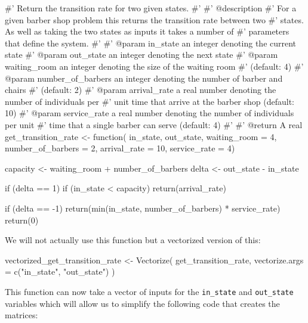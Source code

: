 \begin{Rin}
#' Return the transition rate for two given states.
#'
#' @description
#' For a given barber shop problem this returns the transition rate between two
#' states. As well as taking the two states as inputs it takes a number of
#' parameters that define the system.
#'
#' @param in_state an integer denoting the current state
#' @param out_state an integer denoting the next state
#' @param waiting_room an integer denoting the size of the waiting room
#' (default: 4)
#' @param number_of_barbers an integer denoting the number of barber and chairs
#' (default: 2)
#' @param arrival_rate a real number denoting the number of individuals per
#' unit time that arrive at the barber shop (default: 10)
#' @param service_rate a real number denoting the number of individuals per unit
#' time that a single barber can serve (default: 4)
#'
#' @return A real
get_transition_rate <- function(
                                in_state,
                                out_state,
                                waiting_room = 4,
                                number_of_barbers = 2,
                                arrival_rate = 10,
                                service_rate = 4) {
  capacity <- waiting_room + number_of_barbers
  delta <- out_state - in_state

  if (delta == 1) {
    if (in_state < capacity) {
      return(arrival_rate)
    }
  }

  if (delta == -1) {
    return(min(in_state, number_of_barbers) * service_rate)
  }
  return(0)
}
\end{Rin}

We will not actually use this function but a vectorized version of this:

\begin{Rin}
vectorized_get_transition_rate <- Vectorize(
  get_transition_rate,
  vectorize.args = c("in_state", "out_state")
)
\end{Rin}

This function can now take a vector of inputs for the \texttt{in_state}
and \texttt{out_state} variables which will allow us to simplify the
following code that creates the matrices:

